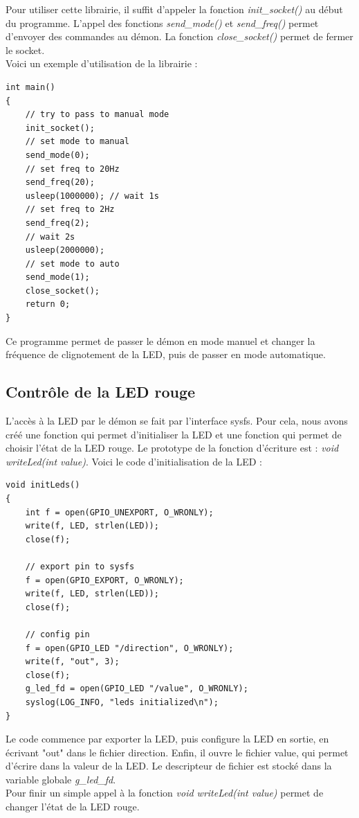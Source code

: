 \documentclass[
	a4paper, %
	10pt, %
]{CSUniSchoolLabReport}
\begin{document}
Pour utiliser cette librairie, il suffit d'appeler la fonction \textit{init\_socket()} au début du programme.
L'appel des fonctions \textit{send\_mode()} et \textit{send\_freq()} permet d'envoyer des commandes au démon.
La fonction \textit{close\_socket()} permet de fermer le socket. \\
Voici un exemple d'utilisation de la librairie : \\
\begin{lstlisting}[style=CStyle]
int main()
{
	// try to pass to manual mode
	init_socket();
	// set mode to manual
	send_mode(0);
	// set freq to 20Hz
	send_freq(20);
	usleep(1000000); // wait 1s
	// set freq to 2Hz
	send_freq(2);
	// wait 2s
	usleep(2000000);
	// set mode to auto
	send_mode(1);
	close_socket();
	return 0;
}
\end{lstlisting}

Ce programme permet de passer le démon en mode manuel et changer la fréquence de clignotement de la LED, puis de passer en mode automatique.

\subsection{Contrôle de la LED rouge}\label{Leds}
L'accès à la LED par le démon se fait par l'interface sysfs.
Pour cela, nous avons créé une fonction qui permet d'initialiser la LED et une fonction qui permet de choisir l'état de la LED rouge.
Le prototype de la fonction d'écriture est : \textit{void writeLed(int value)}.
Voici le code d'initialisation de la LED : \\
\begin{lstlisting}[style=CStyle]
void initLeds()
{
	int f = open(GPIO_UNEXPORT, O_WRONLY);
	write(f, LED, strlen(LED));
	close(f);

	// export pin to sysfs
	f = open(GPIO_EXPORT, O_WRONLY);
	write(f, LED, strlen(LED));
	close(f);

	// config pin
	f = open(GPIO_LED "/direction", O_WRONLY);
	write(f, "out", 3);
	close(f);
	g_led_fd = open(GPIO_LED "/value", O_WRONLY);
	syslog(LOG_INFO, "leds initialized\n");
}
\end{lstlisting}
Le code commence par exporter la LED, puis configure la LED en sortie, en écrivant "out" dans le fichier direction.
Enfin, il ouvre le fichier value, qui permet d'écrire dans la valeur de la LED. Le descripteur de fichier est stocké dans la variable globale \textit{g\_led\_fd}. \\
Pour finir un simple appel à la fonction \textit{void writeLed(int value)} permet de changer l'état de la LED rouge.
\end{document}
